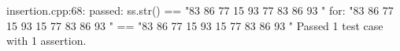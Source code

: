
\begin{DoxyRefList}
\item[\label{test__test000001}%
\Hypertarget{test__test000001}%
File \hyperlink{insertion_8cpp}{insertion.cpp} ]
\begin{DoxyVerbInclude}
insertion.cpp:68: passed: ss.str() == "83 86 77 15 93  77 83 86 93 \n" for: "83 86 77 15 93 
15 77 83 86 93 
"
==
"83 86 77 15 93 
15 77 83 86 93 
"
Passed 1 test case with 1 assertion.

\end{DoxyVerbInclude}
 
\end{DoxyRefList}